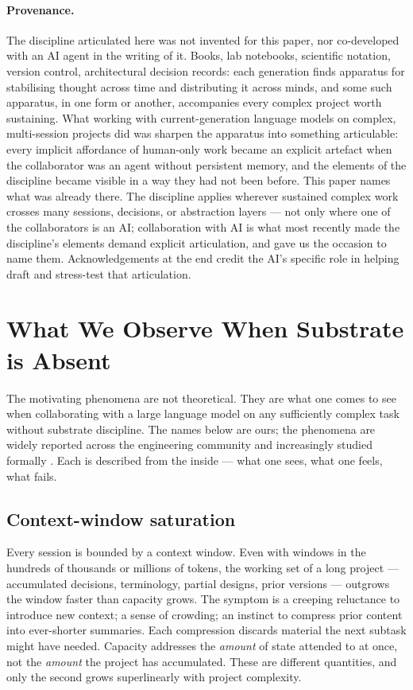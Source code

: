 \documentclass[11pt,a4paper,twocolumn]{article}
\begin{document}
\paragraph{Provenance.} The discipline articulated here was not
invented for this paper, nor co-developed with an AI agent in the
writing of it. Books, lab notebooks,
scientific notation, version control, architectural decision
records: each generation finds apparatus for stabilising thought
across time and distributing it across minds, and some such
apparatus, in one form or another, accompanies every complex
project worth sustaining.
What working with current-generation language models on complex,
multi-session projects did was sharpen the apparatus into
something articulable: every implicit affordance of human-only
work became an explicit artefact when the collaborator was an
agent without persistent memory, and the elements of the
discipline became visible in a way they had not been before. This
paper names what was already there. The discipline applies
wherever sustained complex work crosses many sessions, decisions,
or abstraction layers --- not only where one of the collaborators
is an AI; collaboration with AI is what most recently made the
discipline's elements demand explicit articulation, and gave us
the occasion to name them. Acknowledgements at the end credit the
AI's specific role in helping draft and stress-test that
articulation.

\section{What We Observe When Substrate is Absent}
\label{sec:failures}

The motivating phenomena are not theoretical. They are what one comes
to see when collaborating with a large language model on any
sufficiently complex task without substrate discipline. The names
below are ours; the phenomena are widely reported across the
engineering community and increasingly studied formally
\citep{liu2024lostmiddle, park2023generativeagents, packer2024memgpt}.
Each is described from the inside --- what one sees, what one feels,
what fails.

\subsection{Context-window saturation}
Every session is bounded by a context window. Even with windows in
the hundreds of thousands or millions of tokens, the working set of
a long project --- accumulated decisions, terminology, partial
designs, prior versions --- outgrows the window faster than capacity
grows. The symptom is a creeping reluctance to introduce new
context; a sense of crowding; an instinct to compress prior content
into ever-shorter summaries. Each compression discards material the
next subtask might have needed. Capacity addresses the
\emph{amount} of state attended to at once, not the \emph{amount}
the project has accumulated. These are different quantities, and
only the second grows superlinearly with project complexity.
\end{document}
